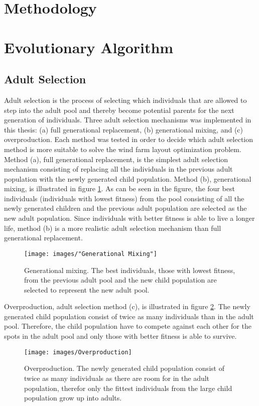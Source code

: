\documentclass{article}
\begin{document}
\section{Methodology}\label{chapter:methodology}%


\section{Evolutionary Algorithm}


\subsection{Adult Selection}
Adult selection is the process of selecting which individuals that are allowed to step into the adult pool and thereby become potential parents for the next generation of individuals. Three adult selection mechanisms was implemented in this thesis: (a) full generational replacement, (b) generational mixing, and (c) overproduction. Each method was tested in order to decide which adult selection method is more suitable to solve the wind farm layout optimization problem. Method (a), full generational replacement, is the simplest adult selection mechanism consisting of replacing all the individuals in the previous adult population with the newly generated child population. Method (b), generational mixing, is illustrated in figure \ref{figure:generational mixing}. As can be seen in the figure, the four best individuals (individuals with lowest fitness) from the pool consisting of all the newly generated children and the previous adult population are selected as the new adult population. Since individuals with better fitness is able to live a longer life, method (b) is a more realistic adult selection mechanism than full generational replacement.


\begin{figure}[h!]
\begin{center}
\texttt{[image: images/"Generational Mixing"]}
\caption{Generational mixing. The best individuals, those with lowest fitness, from the previous adult pool and the new child population are selected to represent the new adult pool.}
\label{figure:generational mixing}
\end{center}
\end{figure}


\noindent Overproduction, adult selection method (c), is illustrated in figure \ref{figure:overproduction}. The newly generated child population consist of twice as many individuals than in the adult pool. Therefore, the child population have to compete against each other for the spots in the adult pool and only those with better fitness is able to survive.


\begin{figure}[h!]
\begin{center}
\texttt{[image: images/Overproduction]}
\caption{Overproduction. The newly generated child population consist of twice as many individuals as there are room for in the adult population, therefor only the fittest individuals from the large child population grow up into adults.}
\label{figure:overproduction}
\end{center}
\end{figure}
\end{document}
